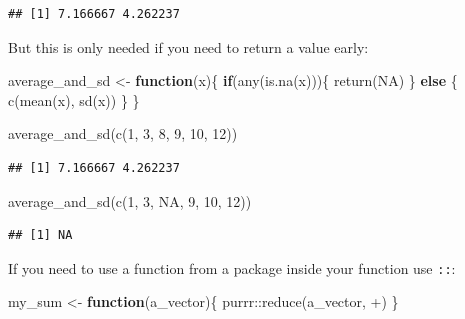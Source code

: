\documentclass[
]{article}
\newenvironment{Shaded}{\begin{snugshade}}{\end{snugshade}}
\newcommand{\AttributeTok}[1]{\textcolor[rgb]{0.77,0.63,0.00}{#1}}
\newcommand{\ConstantTok}[1]{\textcolor[rgb]{0.00,0.00,0.00}{#1}}
\newcommand{\ControlFlowTok}[1]{\textcolor[rgb]{0.13,0.29,0.53}{\textbf{#1}}}
\newcommand{\DecValTok}[1]{\textcolor[rgb]{0.00,0.00,0.81}{#1}}
\newcommand{\FunctionTok}[1]{\textcolor[rgb]{0.00,0.00,0.00}{#1}}
\newcommand{\NormalTok}[1]{#1}
\newcommand{\OtherTok}[1]{\textcolor[rgb]{0.56,0.35,0.01}{#1}}
\newcommand{\SpecialCharTok}[1]{\textcolor[rgb]{0.00,0.00,0.00}{#1}}
\newcommand{\StringTok}[1]{\textcolor[rgb]{0.31,0.60,0.02}{#1}}
\begin{document}
\begin{verbatim}
## [1] 7.166667 4.262237
\end{verbatim}

But this is only needed if you need to return a value early:

\begin{Shaded}
\begin{Highlighting}[]
\NormalTok{average\_and\_sd }\OtherTok{\textless{}{-}} \ControlFlowTok{function}\NormalTok{(x)\{}
\ControlFlowTok{if}\NormalTok{(}\FunctionTok{any}\NormalTok{(}\FunctionTok{is.na}\NormalTok{(x)))\{}
    \FunctionTok{return}\NormalTok{(}\ConstantTok{NA}\NormalTok{)}
\NormalTok{  \} }\ControlFlowTok{else}\NormalTok{ \{}
    \FunctionTok{c}\NormalTok{(}\FunctionTok{mean}\NormalTok{(x), }\FunctionTok{sd}\NormalTok{(x))}
\NormalTok{    \}}
\NormalTok{\}}

\FunctionTok{average\_and\_sd}\NormalTok{(}\FunctionTok{c}\NormalTok{(}\DecValTok{1}\NormalTok{, }\DecValTok{3}\NormalTok{, }\DecValTok{8}\NormalTok{, }\DecValTok{9}\NormalTok{, }\DecValTok{10}\NormalTok{, }\DecValTok{12}\NormalTok{))}
\end{Highlighting}
\end{Shaded}

\begin{verbatim}
## [1] 7.166667 4.262237
\end{verbatim}

\begin{Shaded}
\begin{Highlighting}[]
\FunctionTok{average\_and\_sd}\NormalTok{(}\FunctionTok{c}\NormalTok{(}\DecValTok{1}\NormalTok{, }\DecValTok{3}\NormalTok{, }\ConstantTok{NA}\NormalTok{, }\DecValTok{9}\NormalTok{, }\DecValTok{10}\NormalTok{, }\DecValTok{12}\NormalTok{))}
\end{Highlighting}
\end{Shaded}

\begin{verbatim}
## [1] NA
\end{verbatim}

If you need to use a function from a package inside your function use \texttt{::}:

\begin{Shaded}
\begin{Highlighting}[]
\NormalTok{my\_sum }\OtherTok{\textless{}{-}} \ControlFlowTok{function}\NormalTok{(a\_vector)\{}
\NormalTok{  purrr}\SpecialCharTok{::}\FunctionTok{reduce}\NormalTok{(a\_vector, }\StringTok{\textasciigrave{}}\AttributeTok{+}\StringTok{\textasciigrave{}}\NormalTok{)}
\NormalTok{\}}
\end{Highlighting}
\end{Shaded}
\end{document}
